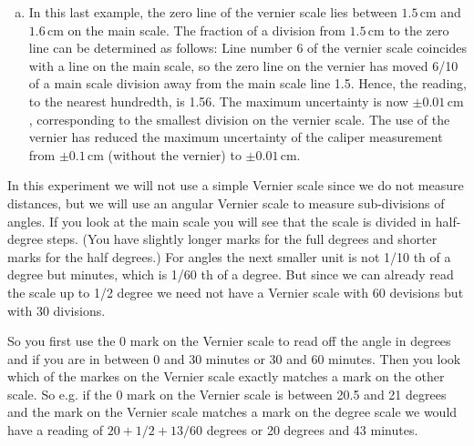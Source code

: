 \begin{enumerate}[a)]
\item In this last example, the zero line of the vernier scale lies between $1.5\,\mathrm{cm}$ and $1.6\,\mathrm{cm}$ on the main scale. The fraction of a division from $1.5\,\mathrm{cm}$ to the zero line can be determined as follows: Line number 6 of the vernier scale coincides with a line on the main scale, so the zero line on the vernier has moved 6/10 of a main scale division away from the main scale line 1.5. Hence, the reading, to the nearest hundredth, is 1.56. The maximum uncertainty is now $\pm 0.01\,\mathrm{cm}$, corresponding to the smallest division on the vernier scale. The use of the vernier has reduced the maximum uncertainty of the caliper measurement from $\pm 0.1\,\mathrm{cm}$ (without the vernier) to $\pm 0.01\,\mathrm{cm}$.
\end{enumerate}

In this experiment we will not use a simple Vernier scale since we do not measure distances, but we will use an angular Vernier scale to measure sub-divisions of angles. If you look at the main scale you will see that the scale is divided in half-degree steps. (You have slightly longer marks for the full degrees and shorter marks for the half degrees.) For angles the next smaller unit is not 1/10 th of a degree but minutes, which is 1/60 th of a degree. But since we can already read the scale up to 1/2 degree we need not have a Vernier scale with 60 devisions but with 30 divisions.\myskip

So you first use the 0 mark on the Vernier scale to read off the angle in degrees and if you are in between 0 and 30 minutes or 30 and 60 minutes. Then you look which of the markes on the Vernier scale exactly matches a mark on the other scale. So e.g. if the 0 mark on the Vernier scale is between 20.5 and 21 degrees and the  mark on the Vernier scale matches a mark on the degree scale we would have a reading of $20 + 1/2+ 13/60$ degrees or 20 degrees and 43 minutes.

